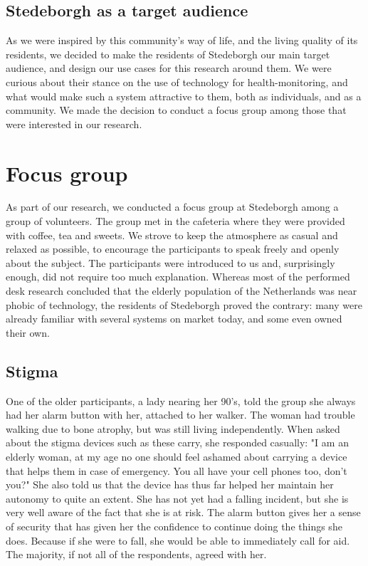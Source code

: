 \documentclass{below-ext}
\begin{document}
\subsection{Stedeborgh as a target audience}
As we were inspired by this community's way of life, and the living quality of its residents, we decided to make the residents of Stedeborgh our main target audience, and design our use cases for this research around them. We were curious about their stance on the use of technology for health-monitoring, and what would make such a system attractive to them, both as individuals, and as a community. We made the decision to conduct a focus group among those that were interested in our research.

\section{Focus group}

As part of our research, we conducted a focus group at Stedeborgh among a group of volunteers. The group met in the cafeteria where they were provided with coffee, tea and sweets. We strove to keep the atmosphere as casual and relaxed as possible, to encourage the participants to speak freely and openly about the subject. The participants were introduced to us and, surprisingly enough, did not require too much explanation. Whereas most of the performed desk research concluded that the elderly population of the Netherlands was near phobic of technology, the residents of Stedeborgh proved the contrary: many were already familiar with several systems on market today, and some even owned their own.

\subsection{Stigma}
\label{ref:alarm_button}
 One of the older participants, a lady nearing her 90's, told the group she always had her alarm button with her, attached to her walker. The woman had trouble walking due to bone atrophy, but was still living independently. When asked about the stigma devices such as these carry, she responded casually: "I am an elderly woman, at my age no one should feel ashamed about carrying a device that helps them in case of emergency. You all have your cell phones too, don't you?" She also told us that the device has thus far helped her maintain her autonomy to quite an extent. She has not yet had a falling incident, but she is very well aware of the fact that she is at risk. The alarm button gives her a sense of security that has given her the confidence to continue doing the things she does. Because if she were to fall, she would be able to immediately call for aid. The majority, if not all of the respondents, agreed with her.
\end{document}

